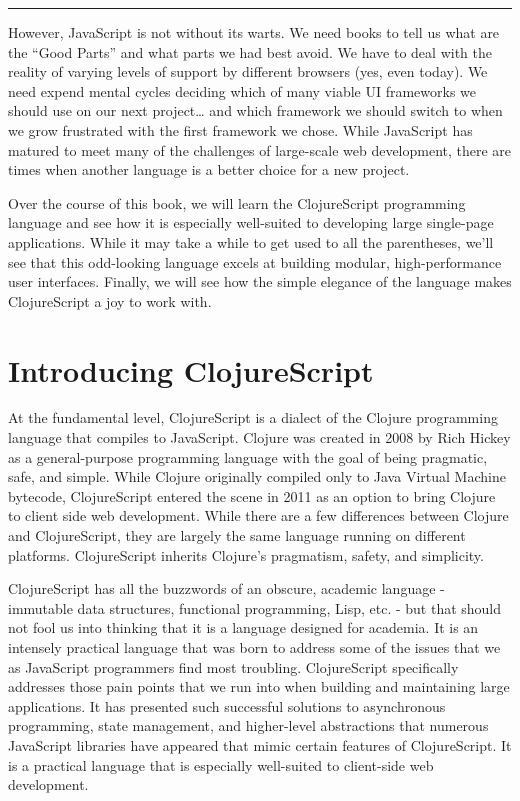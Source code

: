 \documentclass[10pt,twoside,openright]{memoir}
\begin{document}
\begin{center}\rule{0.5\linewidth}{0.5pt}\end{center}

However, JavaScript is not without its warts. We need books to tell us
what are the ``Good Parts'' and what parts we had best avoid. We have to
deal with the reality of varying levels of support by different browsers
(yes, even today). We need expend mental cycles deciding which of many
viable UI frameworks we should use on our next project\ldots{} and which
framework we should switch to when we grow frustrated with the first
framework we chose. While JavaScript has matured to meet many of the
challenges of large-scale web development, there are times when another
language is a better choice for a new project.

Over the course of this book, we will learn the ClojureScript
programming language and see how it is especially well-suited to
developing large single-page applications. While it may take a while to
get used to all the parentheses, we'll see that this odd-looking
language excels at building modular, high-performance user interfaces.
Finally, we will see how the simple elegance of the language makes
ClojureScript a joy to work with.

\section{Introducing ClojureScript}

At the fundamental level, ClojureScript is a dialect of the Clojure
programming language that compiles to JavaScript. Clojure was created in
2008 by Rich Hickey as a general-purpose programming language with the
goal of being pragmatic, safe, and simple. While Clojure originally
compiled only to Java Virtual Machine  bytecode, ClojureScript entered
the scene in 2011 as an option to bring Clojure to client side web
development. While there are a few differences between Clojure and
ClojureScript, they are largely the same language running on different
platforms. ClojureScript inherits Clojure's pragmatism, safety, and
simplicity.

ClojureScript has all the buzzwords of an obscure, academic language -
immutable data structures, functional programming, Lisp, etc. - but that
should not fool us into thinking that it is a language designed for
academia. It is an intensely practical language that was born to address
some of the issues that we as JavaScript programmers find most
troubling. ClojureScript specifically addresses those pain points that
we run into when building and maintaining large applications. It has
presented such successful solutions to asynchronous programming, state
management, and higher-level abstractions that numerous JavaScript
libraries have appeared that mimic certain features of ClojureScript. It
is a practical language that is especially well-suited to client-side
web development.
\end{document}
